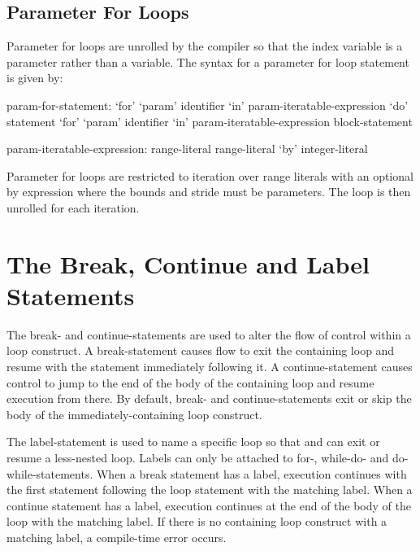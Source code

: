 \subsection{Parameter For Loops}
\label{Parameter_For_Loops}

Parameter for loops are unrolled by the compiler so that the index
variable is a parameter rather than a variable.  The syntax for a
parameter for loop statement is given by:
\begin{syntax}
param-for-statement:
  `for' `param' identifier `in' param-iteratable-expression `do' statement
  `for' `param' identifier `in' param-iteratable-expression block-statement

param-iteratable-expression:
  range-literal
  range-literal `by' integer-literal
\end{syntax}
Parameter for loops are restricted to iteration over range literals
with an optional by expression where the bounds and stride must be
parameters.  The loop is then unrolled for each iteration.

\pagebreak
\section{The Break, Continue and Label Statements}
\label{Label_Break_Continue}

The break- and continue-statements are used to alter the flow of control within a
loop construct.  A break-statement causes flow to exit the containing loop and
resume with the statement immediately following it.  A continue-statement causes
control to jump to the end of the body of the containing loop and resume
execution from there.  By default, break- and continue-statements exit
or skip the body of the immediately-containing loop construct.

The label-statement is used to name a specific loop so that 
and  can exit or resume a less-nested loop.
Labels can only be attached to for-, while-do- and do-while-statements.
When a break statement has a label, execution continues with the first statement
following the loop statement with the matching label.  When a continue statement
has a label, execution continues at the end of the body of the loop with the
matching label.  If there is no containing loop construct with a matching label,
a compile-time error occurs.

